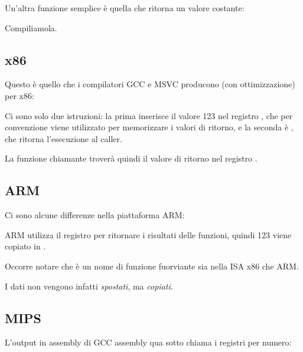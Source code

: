\label{ret_val_func}

Un'altra funzione semplice è quella che ritorna un valore costante:



Compiliamola.

\subsection{x86}

Questo è quello che i compilatori GCC e MSVC producono (con ottimizzazione) per x86:



Ci sono solo due istruzioni: la prima inserisce il valore 123 nel registro \EAX,
che per convenzione viene utilizzato per memorizzare i valori di ritorno,
e la seconda è \RET, che ritorna l'esecuzione al \gls{caller}.

La funzione chiamante troverà quindi il valore di ritorno nel registro \EAX.

\subsection{ARM}

Ci sono alcune differenze nella piattaforma ARM:



ARM utilizza il registro  per ritornare i risultati delle funzioni, quindi 123 viene copiato in .

Occorre notare che \MOV è un nome di funzione fuorviante sia nella \ac{ISA} x86 che ARM.

I dati non vengono infatti \emph{spostati}, ma \emph{copiati}.

\subsection{MIPS}

\label{MIPS_leaf_function_ex1}

L'output in assembly di GCC assembly qua sotto chiama i registri per numero:

